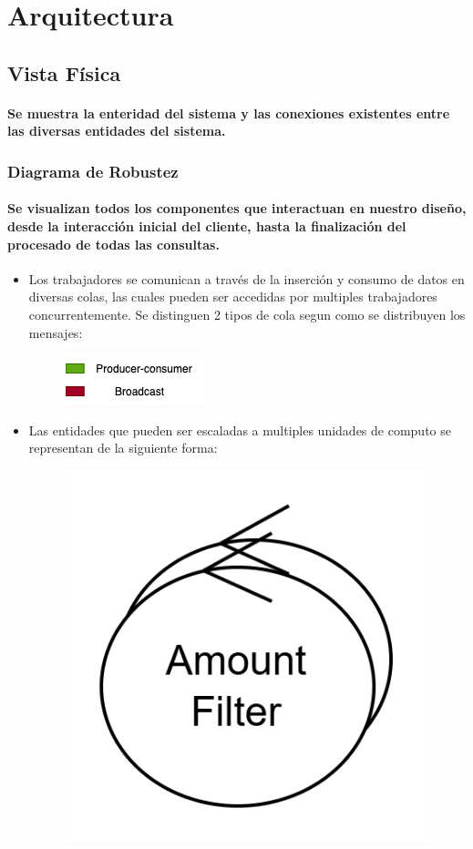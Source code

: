 \documentclass[titlepage,a4paper]{article}
\begin{document}
\section{Arquitectura}\label{sec:arquitectura}

\subsection{Vista Física}
\paragraph{Se muestra la enteridad del sistema y las conexiones existentes entre las diversas entidades del sistema.}

\subsubsection{Diagrama de Robustez}
\paragraph{Se visualizan todos los componentes que interactuan en nuestro diseño, desde la interacción inicial del cliente, hasta la finalización del procesado de todas las consultas.}
\begin{itemize}
    \item Los trabajadores se comunican a través de la inserción y consumo de datos en diversas colas, las cuales pueden ser accedidas por multiples trabajadores concurrentemente. Se distinguen 2 tipos de cola segun como se distribuyen los mensajes:
\begin{figure}[H]
\centering
    \includegraphics[width=0.30\linewidth]{colas.png}
\end{figure}
\end{itemize}
\begin{itemize}
    \item Las entidades que pueden ser escaladas a multiples unidades de computo se representan de la siguiente forma:
\begin{figure}[H]
\centering
    \includegraphics[width=0.15\linewidth]{multiple_computo.png}
\end{figure}
\end{itemize}
\end{document}
